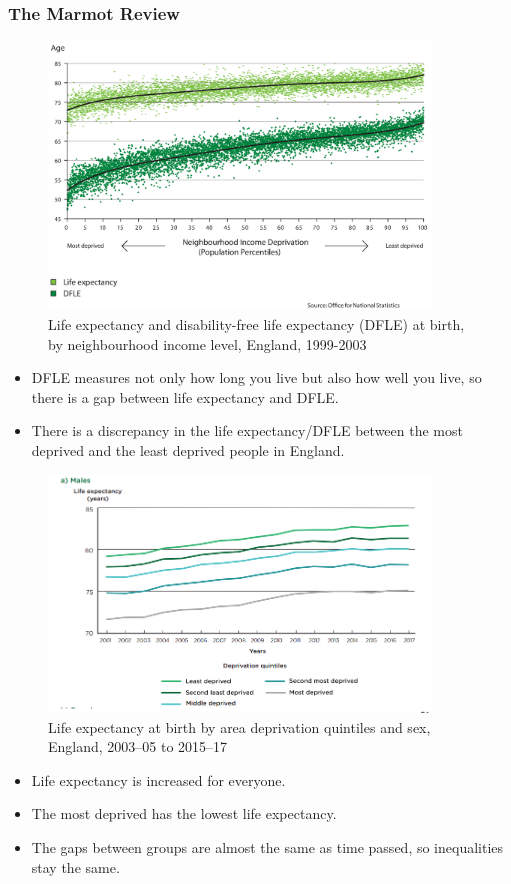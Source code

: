 \subsubsection{The Marmot Review}
\begin{figure}[H]%
                \centering
                \includegraphics[width=4in]{images/ch3/28.png}
                \caption{Life expectancy and disability-free life expectancy (DFLE) at birth, by neighbourhood income level, England, 1999-2003}
                \label{fig:label}
            \end{figure}
\begin{itemize}
        \item DFLE measures not only how long you live but also how well you live, so there is a gap between life expectancy and DFLE.
        \item There is a discrepancy in the life expectancy/DFLE between the most deprived and the least deprived people in England.
\end{itemize} 

\begin{figure}[H]%
                \centering
                \includegraphics[width=4in]{images/ch3/29.png}
                \caption{Life expectancy at birth by area deprivation quintiles and sex, England, 2003–05 to 2015–17}
                \label{fig:label}
            \end{figure}
\begin{itemize}
        \item Life expectancy is increased for everyone.
        \item The most deprived has the lowest life expectancy.
        \item The gaps between groups are almost the same as time passed, so inequalities stay the same.
\end{itemize}

